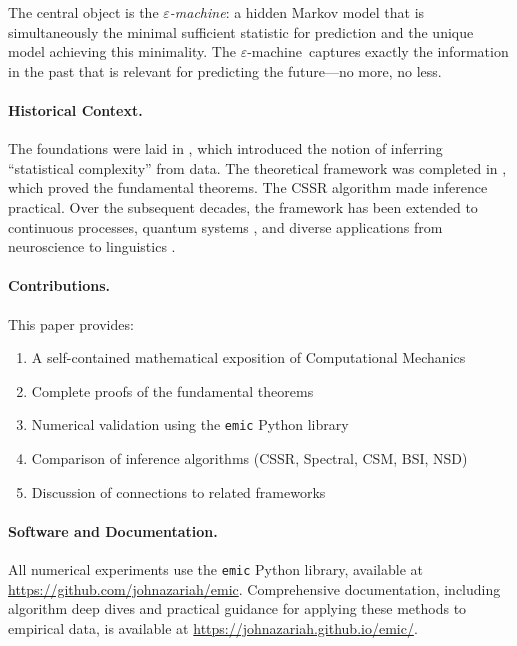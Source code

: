 \documentclass[11pt,twocolumn]{article}
\theoremstyle{plain}
\theoremstyle{definition}
\theoremstyle{remark}
\newcommand{\eps}{\varepsilon}
\newcommand{\eM}{$\eps$-machine}
\begin{document}
The central object is the \emph{\eM}: a hidden Markov model that is simultaneously the minimal sufficient statistic for prediction and the unique model achieving this minimality. The \eM\ captures exactly the information in the past that is relevant for predicting the future---no more, no less.

\paragraph{Historical Context.} The foundations were laid in \cite{crutchfield1989inferring}, which introduced the notion of inferring ``statistical complexity'' from data. The theoretical framework was completed in \cite{shalizi2001computational}, which proved the fundamental theorems. The CSSR algorithm \cite{shalizi2004algorithm} made inference practical. Over the subsequent decades, the framework has been extended to continuous processes, quantum systems \cite{gu2012quantum,thompson2018causal}, and diverse applications from neuroscience to linguistics \cite{james2011anatomy,marzen2015informational}.

\paragraph{Contributions.} This paper provides:
\begin{enumerate}[nosep]
    \item A self-contained mathematical exposition of Computational Mechanics
    \item Complete proofs of the fundamental theorems
    \item Numerical validation using the \texttt{emic} Python library
    \item Comparison of inference algorithms (CSSR, Spectral, CSM, BSI, NSD)
    \item Discussion of connections to related frameworks
\end{enumerate}

\paragraph{Software and Documentation.} All numerical experiments use the \texttt{emic} Python library, available at \url{https://github.com/johnazariah/emic}. Comprehensive documentation, including algorithm deep dives and practical guidance for applying these methods to empirical data, is available at \url{https://johnazariah.github.io/emic/}.
\end{document}
